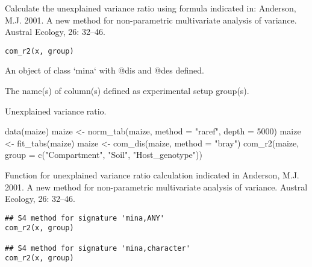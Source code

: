 \documentclass[a4paper]{book}
\begin{document}
%
\begin{Description}\relax
Calculate the unexplained variance ratio using formula indicated in:
Anderson, M.J. 2001. A new method for non-parametric multivariate analysis of
variance. Austral Ecology, 26: 32--46.
\end{Description}
%
\begin{Usage}
\begin{verbatim}
com_r2(x, group)
\end{verbatim}
\end{Usage}
%
\begin{Arguments}
\begin{ldescription}
\item[\code{x}] An object of class `mina` with @dis and @des defined.

\item[\code{group}] The name(s) of column(s) defined as experimental setup group(s).
\end{ldescription}
\end{Arguments}
%
\begin{Value}
Unexplained variance ratio.
\end{Value}
%
\begin{Examples}
\begin{ExampleCode}
data(maize)
maize <- norm_tab(maize, method = "raref", depth = 5000)
maize <- fit_tabs(maize)
maize <- com_dis(maize, method = "bray")
com_r2(maize, group = c("Compartment", "Soil", "Host_genotype"))
\end{ExampleCode}
\end{Examples}
%
\begin{Description}\relax
Function for unexplained variance ratio calculation indicated in
Anderson, M.J. 2001. A new method for non-parametric multivariate analysis of
variance. Austral Ecology, 26: 32--46.
\end{Description}
%
\begin{Usage}
\begin{verbatim}
## S4 method for signature 'mina,ANY'
com_r2(x, group)

## S4 method for signature 'mina,character'
com_r2(x, group)
\end{verbatim}
\end{Usage}
\end{document}
